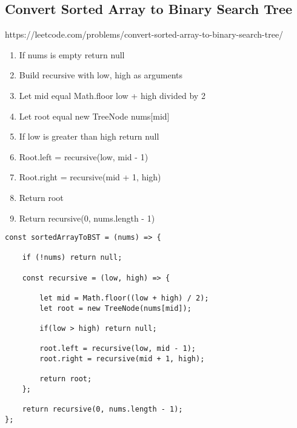 \documentclass[10pt]{article}
\begin{document}
\medskip %















\pagebreak
\medskip   
\subsection {Convert Sorted Array to Binary Search Tree}
https://leetcode.com/problems/convert-sorted-array-to-binary-search-tree/

\begin{enumerate}
	\item If nums is empty return null
	\item Build recursive with low, high as arguments
	\item Let mid equal Math.floor low + high divided by 2 
	\item Let root equal new TreeNode nums[mid]
	\item If low is greater than high return null
	\item Root.left = recursive(low, mid - 1)
	\item Root.right = recursive(mid + 1, high)
	\item Return root
	\item Return recursive(0, nums.length - 1)
\end{enumerate}

\begin{lstlisting}[title=Solution sortedArrayToBST, captionpos=t]
const sortedArrayToBST = (nums) => {
    
    if (!nums) return null;
    
    const recursive = (low, high) => {
        
        let mid = Math.floor((low + high) / 2);
        let root = new TreeNode(nums[mid]);
        
        if(low > high) return null;
        
        root.left = recursive(low, mid - 1);
        root.right = recursive(mid + 1, high);
        
        return root;
    };
    
    return recursive(0, nums.length - 1);
};
\end{lstlisting}

\medskip %
\end{document}
